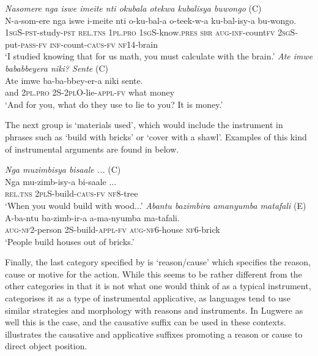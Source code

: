 \documentclass[output=paper,colorlinks,citecolor=brown,draftmode]{langscibook}
\begin{document}
\ea
\begin{xlist}   \label{ex:Saebo:assists}
 \ex \emph{Nasomere 	nga iswe imeite nti okubala otekwa 	kubalisya 		buwongo} (C) \\
  \gll N-a-som-ere nga iswe i-meite nti o-ku-bal-a 	o-teek-w-a 		ku-bal-isy-a 	bu-wongo. \\ 
\textsc{1sg}S-\textsc{pst}-study-\textsc{pst} \textsc{rel.tns} \textsc{1pl.pro} \textsc{1sg}S-know.\textsc{pres} \textsc{sbr} \textsc{aug-inf}-count\textsc{fv} \textsc{2sg}S-put-\textsc{pass-fv} \textsc{inf}-count-\textsc{caus-fv} \textsc{nf14}-brain\\
    \glt  `I studied knowing that for us math, you must calculate with the brain.' 
 \ex \emph{Ate imwe 	bababbeyera niki? Sente} (C) \\
  \gll  Ate 	imwe ba-ba-bbey-er-a niki sente. \\ 
and \textsc{2pl.pro} 2S-\textsc{2pl}O-lie-\textsc{appl-fv} what money\\
    \glt  `And for you, what do they use to lie to you? It is money.' 
      \end{xlist}     
      \z

The next group is ‘materials used’, which would include the instrument in phrases such as  ‘build with bricks’ or ‘cover with a shawl’. Examples of this kind of instrumental arguments are found in  below. 

\newpage
\ea
\begin{xlist}   \label{ex:Saebo:material}
 \ex \emph{Nga muzimbisya bisaale ...} (C) \\
  \gll Nga 		mu-zimb-isy-a 		bi-saale ... \\ 
\textsc{rel.tns}  \textsc{2pl}S-build-\textsc{caus-fv} \textsc{nf8}-tree\\
    \glt  `When you would build with wood...' 
 \ex \emph{Abantu bazimbira 	amanyumba	matafali} (E) \\
  \gll A-ba-ntu ba-zimb-ir-a a-ma-nyumba ma-tafali.  \\ 
\textsc{aug-nf2}-person 2S-build-\textsc{appl-fv} \textsc{aug-nf6}-house \textsc{nf6}-brick \\
    \glt  `People build houses out of bricks.' 
      \end{xlist}     
      \z

Finally, the last category specified by \citet{dixon2010basic} is ‘reason/cause’ which specifies the reason, cause or motive for the action. While this seems to be rather different from the other categories in that it is not what one would think of as a typical instrument, \cite{dixon2010basic} categorises it as a type of instrumental applicative, as languages tend to use similar strategies and morphology with reasons and instruments. In Lugwere as well this is the case, and the causative suffix can be used in these contexts.  illustrates the causative and applicative suffixes promoting a reason or cause to direct object position. 
\end{document}
